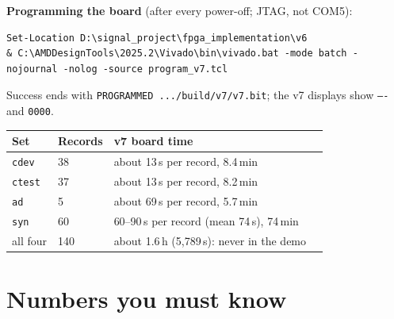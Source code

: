 \documentclass[11pt]{article}
\begin{document}
\textbf{Programming the board} (after every power-off; JTAG, not COM5):
\begin{lstlisting}
Set-Location D:\signal_project\fpga_implementation\v6
& C:\AMDDesignTools\2025.2\Vivado\bin\vivado.bat -mode batch -nojournal -nolog -source program_v7.tcl
\end{lstlisting}
Success ends with \texttt{PROGRAMMED .../build/v7/v7.bit}; the v7 displays show \texttt{----} and \texttt{0000}.

\begin{center}
\small
\begin{tabular}{@{}llll@{}}
\toprule
\textbf{Set} & \textbf{Records} & \textbf{v7 board time} & \\
\midrule
\texttt{cdev} & 38 & about 13\,s per record, 8.4\,min & \\
\texttt{ctest} & 37 & about 13\,s per record, 8.2\,min & \\
\texttt{ad} & 5 & about 69\,s per record, 5.7\,min & \\
\texttt{syn} & 60 & 60--90\,s per record (mean 74\,s), 74\,min & \\
all four & 140 & about 1.6\,h (5,789\,s): never in the demo & \\
\bottomrule
\end{tabular}
\end{center}

\section{Numbers you must know}
\label{sec:numbers}
\end{document}
